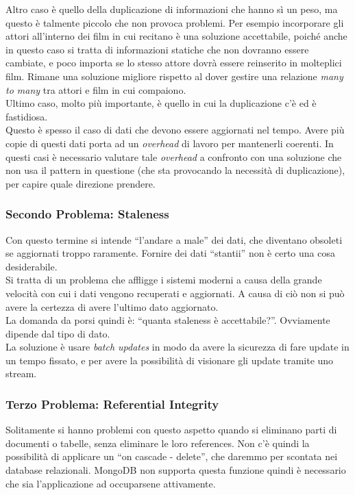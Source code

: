 \noindent Altro caso è quello della duplicazione di informazioni che hanno sì un peso, ma questo è talmente piccolo che non provoca problemi. Per esempio incorporare gli attori all'interno dei film in cui recitano è una soluzione accettabile, poiché anche in questo caso si tratta di informazioni statiche che non dovranno essere cambiate, e poco importa se lo stesso attore dovrà essere reinserito in molteplici film. Rimane una soluzione migliore rispetto al dover gestire una relazione \textit{many to many} tra attori e film in cui compaiono.\\

\noindent Ultimo caso, molto più importante, è quello in cui la duplicazione c'è ed è fastidiosa.\\
Questo è spesso il caso di dati che devono essere aggiornati nel tempo. Avere più copie di questi dati porta ad un \textit{overhead} di lavoro per mantenerli coerenti. In questi casi è necessario valutare tale \textit{overhead} a confronto con una soluzione che non usa il pattern in questione (che sta provocando la necessità di duplicazione), per capire quale direzione prendere.\\

\subsubsection{Secondo Problema: Staleness}
Con questo termine si intende ``l'andare a male'' dei dati, che diventano obsoleti se aggiornati troppo raramente. Fornire dei dati ``stantii'' non è certo una cosa desiderabile.\\
Si tratta di un problema che affligge i sistemi moderni a causa della grande velocità con cui i dati vengono recuperati e aggiornati. A causa di ciò non si può avere la certezza di avere l'ultimo dato aggiornato.\\
La domanda da porsi quindi è: ``quanta staleness è accettabile?''. Ovviamente dipende dal tipo di dato.\\
La soluzione è usare \textit{batch updates} in modo da avere la sicurezza di fare update in un tempo fissato, e per avere la possibilità di visionare gli update tramite uno stream.\\

\subsubsection{Terzo Problema: Referential Integrity}
Solitamente si hanno problemi con questo aspetto quando si eliminano parti di documenti o tabelle, senza eliminare le loro references. Non c'è quindi la possibilità di applicare un ``on cascade - delete'', che daremmo per scontata nei database relazionali. MongoDB non supporta questa funzione quindi è necessario che sia l'applicazione ad occuparsene attivamente.\\\\

